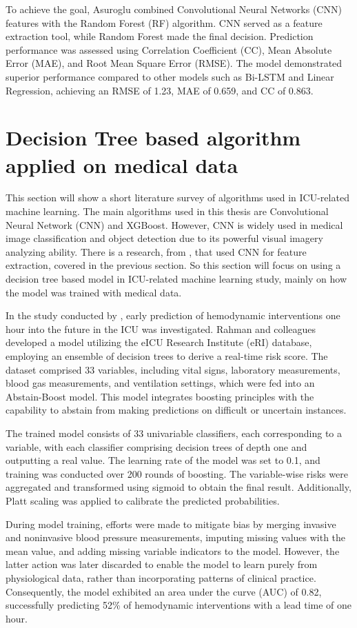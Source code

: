 \documentclass[12pt,a4paper,english
]{tunithesis}
\begin{document}
To achieve the goal, Asuroglu combined Convolutional Neural Networks (CNN) features with the Random Forest (RF) algorithm. CNN served as a feature extraction tool, while Random Forest made the final decision. Prediction performance was assessed using Correlation Coefficient (CC), Mean Absolute Error (MAE), and Root Mean Square Error (RMSE). The model demonstrated superior performance compared to other models such as Bi-LSTM and Linear Regression, achieving an RMSE of 1.23, MAE of 0.659, and CC of 0.863.

\section{Decision Tree based algorithm applied on medical data}
This section will show a short literature survey of algorithms used in ICU-related machine learning. The main algorithms used in this thesis are Convolutional Neural Network (CNN) and XGBoost. However, CNN is widely used in medical image classification and object detection due to its powerful visual imagery analyzing ability. There is a research, from \textcite{asuroglu2021}, that used CNN for feature extraction, covered in the previous section. So this section will focus on using a decision tree based model in ICU-related machine learning study, mainly on how the model was trained with medical data.

In the study conducted by \textcite{rahman2021}, early prediction of hemodynamic interventions one hour into the future in the ICU was investigated. Rahman and colleagues developed a model utilizing the eICU Research Institute (eRI) database, employing an ensemble of decision trees to derive a real-time risk score. The dataset comprised 33 variables, including vital signs, laboratory measurements, blood gas measurements, and ventilation settings, which were fed into an Abstain-Boost model. This model integrates boosting principles with the capability to abstain from making predictions on difficult or uncertain instances.

The trained model consists of 33 univariable classifiers, each corresponding to a variable, with each classifier comprising decision trees of depth one and outputting a real value. The learning rate of the model was set to 0.1, and training was conducted over 200 rounds of boosting. The variable-wise risks were aggregated and transformed using sigmoid to obtain the final result. Additionally, Platt scaling was applied to calibrate the predicted probabilities.

During model training, efforts were made to mitigate bias by merging invasive and noninvasive blood pressure measurements, imputing missing values with the mean value, and adding missing variable indicators to the model. However, the latter action was later discarded to enable the model to learn purely from physiological data, rather than incorporating patterns of clinical practice. Consequently, the model exhibited an area under the curve (AUC) of 0.82, successfully predicting 52\% of hemodynamic interventions with a lead time of one hour.
\end{document}
